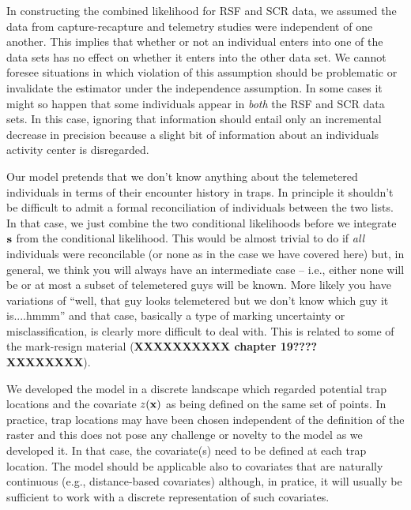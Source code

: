 In constructing the combined likelihood for RSF and SCR data, we
assumed the data from capture-recapture and telemetry studies were
independent of one another. This implies that whether or not an
individual enters into one of the data sets has no effect on whether
it enters into the other data set.  We cannot foresee situations in
which violation of this assumption should be problematic or invalidate
the estimator under the independence assumption.  In some cases it
might so happen that some individuals appear in {\it both} the RSF and
SCR data sets. In this case, ignoring that information should entail
only an incremental decrease in precision because a slight bit of
information about an individuals activity center is disregarded.  

 Our model pretends that we don't know anything
about the telemetered individuals in terms of their encounter history
in traps.  In principle it shouldn't be difficult to admit a formal
reconciliation of individuals between the two lists. In that case, we
just combine the two conditional likelihoods before we integrate ${\bf
  s}$ from the conditional likelihood. This would be almost trivial to
do if {\it all} individuals were reconcilable (or none as in the case
we have covered here) but, in general, we think you will always have
an intermediate case -- i.e., either none will be or at most a subset
of telemetered guys will be known. More likely you have variations of ``well, that
guy looks telemetered but we don't know which guy it is....hmmm'' and
that case, basically a type of marking uncertainty or
misclassification, is clearly more difficult to deal with.
This is related to some of the mark-resign material ({\bf XXXXXXXXXX
chapter 19???? XXXXXXXX}). 

We developed the model in a discrete landscape which regarded
potential trap
locations and the covariate $z({\bf x})$ as being defined on the same
set of points. In practice, trap locations may have been chosen
independent of the definition of the raster and this does not pose any
challenge or novelty to the model as we developed it. In that 
case, the covariate(s) need to be defined  at each trap location. 
The model should be applicable also to covariates that are naturally
continuous (e.g., distance-based covariates) although, in pratice, it
will usually be sufficient to work with a discrete representation of
such covariates. 

